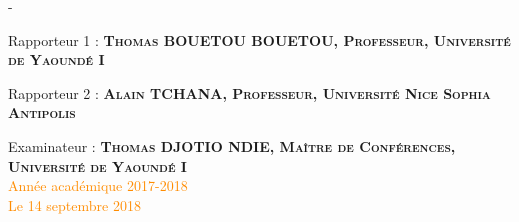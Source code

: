 \begin{titlingpage}
\begin{SingleSpace}
\begin{adjustwidth*}{\unitlength}{-\unitlength}
\begin{center}
{\Large Rapporteur 1 :} {\large \textsc{\textbf{Thomas BOUETOU BOUETOU, Professeur, Université de Yaoundé I}}}\\ 
\vspace{4mm}

{\Large Rapporteur 2 :} {\large \textsc{\textbf{Alain TCHANA, Professeur, Université Nice Sophia Antipolis}}}\\ 
\vspace{4mm}

{\Large Examinateur :} {\large \textsc{\textbf{Thomas DJOTIO NDIE, Maître de Conférences, Université de Yaoundé I}}}\\
\vspace{4.5mm}
{\textcolor{darkorange}{Année académique 2017-2018}}\\
{\textcolor{darkorange}{Le 14 septembre 2018}}


\end{center}


\end{adjustwidth*}

\end{SingleSpace}
\end{titlingpage}

